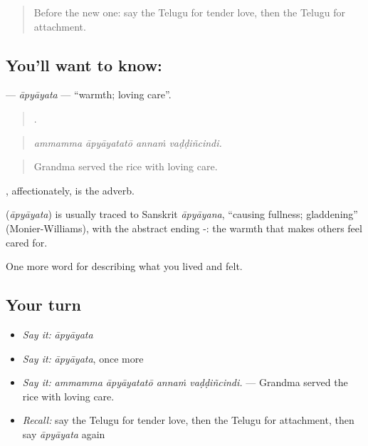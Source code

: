 \label{lesson:TE-C503-apyayata}



\begin{quote}
Before the new one: say the Telugu for tender love, then the Telugu for attachment.
\end{quote}

\subsection*{You'll want to know: }
\textbf{} — \emph{āpyāyata} — \textquotedblleft{}warmth; loving care\textquotedblright{}.

\begin{quote}
   .
\end{quote}

\begin{quote}
\emph{ammamma āpyāyatatō annaṁ vaḍḍiñcindi.}
\end{quote}

\begin{quote}
Grandma served the rice with loving care.
\end{quote}

, affectionately, is the adverb.

\begin{cousinweb}
\textbf{} (\emph{āpyāyata}) is usually traced to Sanskrit \emph{āpyāyana}, \textquotedblleft{}causing fullness; gladdening\textquotedblright{} (Monier-Williams), with the abstract ending -: the warmth that makes others feel cared for.
\end{cousinweb}

\begin{grammarlens}[title={What you've built}]
One more word for describing what you lived and felt.
\end{grammarlens}

\subsection*{Your turn}
\begin{itemize}
\raggedright
  \item \emph{Say it:} \emph{āpyāyata}
  \item \emph{Say it:} \emph{āpyāyata}, once more
  \item \emph{Say it:} \emph{ammamma āpyāyatatō annaṁ vaḍḍiñcindi.} — Grandma served the rice with loving care.
  \item \emph{Recall:} say the Telugu for tender love, then the Telugu for attachment, then say \emph{āpyāyata} again
\end{itemize}

